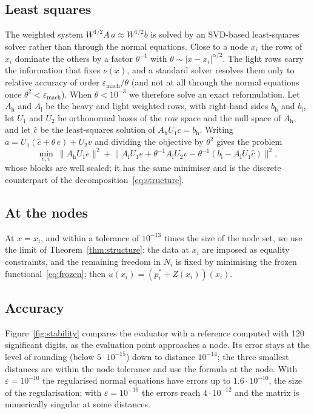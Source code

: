 \documentclass[12pt]{amsart}
\theoremstyle{definition}
\theoremstyle{remark}
\begin{document}
\subsection{Least squares}
 The weighted system $W^{1/2}A\,a\approx W^{1/2}b$ is solved by an
SVD-based least-squares solver rather than through the normal equations. Close to a node $x_i$
the rows of $x_i$ dominate the others by a factor $\theta^{-1}$ with $\theta\sim|x-x_i|^{\alpha/2}$.
The light rows carry the information that fixes $\nu(x)$, and a standard solver resolves them only
to relative accuracy of order $\varepsilon_{\mathrm{mach}}/\theta$ (and not at all through the
normal equations once $\theta^2<\varepsilon_{\mathrm{mach}}$). When $\theta<10^{-3}$ we therefore
solve an exact reformulation. Let $A_{\mathrm h}$ and $A_{\mathrm l}$ be the heavy and light weighted
rows, with right-hand sides $b_{\mathrm h}$ and $b_{\mathrm l}$, let $U_1$ and $U_2$ be orthonormal
bases of the row space and the null space of $A_{\mathrm h}$, and let $\hat c$ be the least-squares
solution of $A_{\mathrm h}U_1c=b_{\mathrm h}$. Writing $a=U_1(\hat c+\theta\,e)+U_2v$ and dividing the
objective by $\theta^2$ gives the problem
\[
  \min_{e,v}\ \|A_{\mathrm h}U_1e\|^2+\bigl\|A_{\mathrm l}U_1e+\theta^{-1}A_{\mathrm l}U_2v
  -\theta^{-1}(b_{\mathrm l}-A_{\mathrm l}U_1\hat c)\bigr\|^2,
\]
whose blocks are well scaled; it has the same minimiser and is the discrete counterpart of the
decomposition~\eqref{eq:structure}.

\subsection{At the nodes}
 At $x=x_i$, and within a tolerance of $10^{-13}$ times the size of the
node set, we use the limit of Theorem~\ref{thm:structure}: the data
at $x_i$ are imposed as equality constraints, and the remaining freedom in $N_i$ is fixed by
minimising the frozen functional~\eqref{eq:frozen}; then $u(x_i)=(p_i^*+Z(x_i))(x_i)$.

\subsection{Accuracy}
 Figure~\ref{fig:stability} compares the evaluator with a reference
computed with 120 significant digits, as the evaluation point approaches a node. Its error
stays at the level of rounding (below $5\cdot10^{-15}$) down to distance $10^{-14}$; the three smallest distances are within the node
tolerance and use the formula at the node. With $\varepsilon=10^{-10}$ the
regularised normal equations have errors up to $1.6\cdot10^{-10}$, the size of the
regularisation; with $\varepsilon=10^{-16}$ the errors reach $4\cdot10^{-12}$ and the matrix is
numerically singular at some distances.
\end{document}
